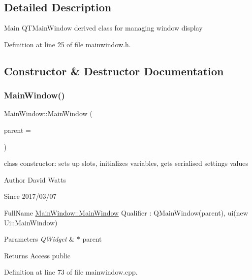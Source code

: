 \subsection{Detailed Description}
Main Q\+T\+Main\+Window derived class for managing window display 

Definition at line 25 of file mainwindow.\+h.



\subsection{Constructor \& Destructor Documentation}
\mbox{\label{class_main_window_a8b244be8b7b7db1b08de2a2acb9409db}} 
\subsubsection{\texorpdfstring{Main\+Window()}{MainWindow()}}
{\footnotesize\ttfamily Main\+Window\+::\+Main\+Window (\begin{DoxyParamCaption}\item[{Q\+Widget $\ast$}]{parent = {} }\end{DoxyParamCaption})\hspace{0.3cm}{\ttfamily [explicit]}}

class constructor\+: sets up slots, initializes variables, gets serialised settings values

\begin{DoxyAuthor}{Author}
David Watts 
\end{DoxyAuthor}
\begin{DoxySince}{Since}
2017/03/07
\end{DoxySince}
Full\+Name \hyperlink{class_main_window_a8b244be8b7b7db1b08de2a2acb9409db}{Main\+Window\+::\+Main\+Window} Qualifier \+: Q\+Main\+Window(parent), ui(new Ui\+::\+Main\+Window) 
\begin{DoxyParams}{Parameters}
{\em Q\+Widget} & $\ast$ parent \\
\hline
\end{DoxyParams}
\begin{DoxyReturn}{Returns}
Access public 
\end{DoxyReturn}


Definition at line 73 of file mainwindow.\+cpp.

